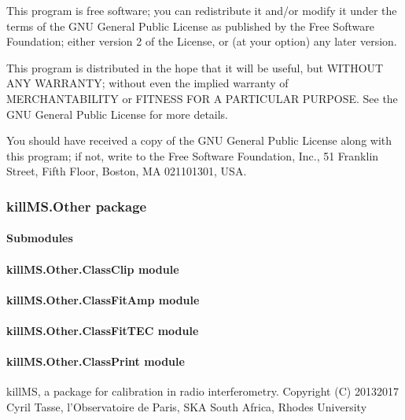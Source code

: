 \documentclass[letterpaper,10pt,english]{sphinxmanual}
\begin{document}
\sphinxAtStartPar
This program is free software; you can redistribute it and/or
modify it under the terms of the GNU General Public License
as published by the Free Software Foundation; either version 2
of the License, or (at your option) any later version.

\sphinxAtStartPar
This program is distributed in the hope that it will be useful,
but WITHOUT ANY WARRANTY; without even the implied warranty of
MERCHANTABILITY or FITNESS FOR A PARTICULAR PURPOSE.  See the
GNU General Public License for more details.

\sphinxAtStartPar
You should have received a copy of the GNU General Public License
along with this program; if not, write to the Free Software
Foundation, Inc., 51 Franklin Street, Fifth Floor, Boston, MA  02110\sphinxhyphen{}1301, USA.

\sphinxstepscope


\subsubsection{killMS.Other package}
\label{\detokenize{api/killMS.Other:killms-other-package}}\label{\detokenize{api/killMS.Other::doc}}

\paragraph{Submodules}
\label{\detokenize{api/killMS.Other:submodules}}

\paragraph{killMS.Other.ClassClip module}
\label{\detokenize{api/killMS.Other:killms-other-classclip-module}}

\paragraph{killMS.Other.ClassFitAmp module}
\label{\detokenize{api/killMS.Other:killms-other-classfitamp-module}}

\paragraph{killMS.Other.ClassFitTEC module}
\label{\detokenize{api/killMS.Other:killms-other-classfittec-module}}

\paragraph{killMS.Other.ClassPrint module}
\label{\detokenize{api/killMS.Other:module-killMS.Other.ClassPrint}}\label{\detokenize{api/killMS.Other:killms-other-classprint-module}}
\sphinxAtStartPar
killMS, a package for calibration in radio interferometry.
Copyright (C) 2013\sphinxhyphen{}2017  Cyril Tasse, l’Observatoire de Paris,
SKA South Africa, Rhodes University
\end{document}
